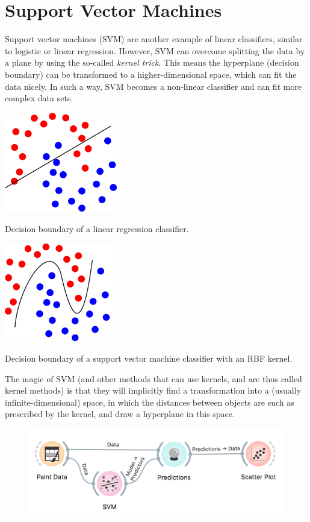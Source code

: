 \chapter{Support Vector Machines}
\label{ch:svm}

Support vector machines (SVM) are another example of linear classifiers, similar to logistic or linear regression. However, SVM can overcome splitting the data by a plane by using the so-called \textit{kernel trick}. This means the hyperplane (decision boundary) can be transformed to a higher-dimensional space, which can fit the data nicely. In such a way, SVM becomes a non-linear classifier and can fit more complex data sets.

\begin{marginfigure}
    \includegraphics[width=50mm]{linear-regression.png}%
    \caption{Decision boundary of a linear regression classifier.}
  \end{marginfigure}

\begin{marginfigure}
    \includegraphics[width=50mm]{svm.png}%
    \caption{Decision boundary of a support vector machine classifier with an RBF kernel.}
\end{marginfigure}

The magic of SVM (and other methods that can use kernels, and are thus called kernel methods) is that they will implicitly find a transformation into a (usually infinite-dimensional) space, in which the distances between objects are such as prescribed by the kernel, and draw a hyperplane in this space.

\begin{figure}[h]
    \centering
    \includegraphics[scale=0.5]{workflow.png}
    \caption{$\;$}
\end{figure}

